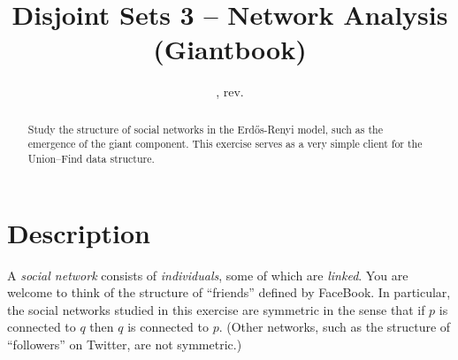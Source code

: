 \documentclass{tufte-handout}
\title{Disjoint Sets 3 -- Network Analysis (Giantbook)}
\author{}
\date{\GITAuthorDate, rev. \GITAbrHash}
\begin{document}
\maketitle

\begin{abstract}Study the structure of social networks in the
  Erd\H{o}s-Renyi model, such as the emergence of the giant component. 
  This exercise serves as a very simple client for
  the Union--Find data structure.
\end{abstract}

\section{Description}
A \emph{social network} consists of \emph{individuals}, some of which are \emph{linked}. 
You are welcome to think of the structure of ``friends'' defined by FaceBook.
In particular, the social networks studied in this exercise are
symmetric in the sense that if $p$ is connected to $q$ then $q$ is connected
to $p$.
(Other networks, such as the structure of ``followers'' on Twitter, are
not symmetric.)
\end{document}

